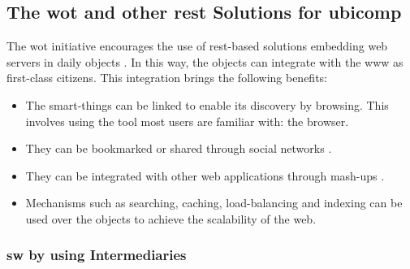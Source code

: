 \subsection{The \acl{wot} and other \ac{rest} Solutions for \acs{ubicomp}}



The \acl{wot} initiative encourages the use of \acs{rest}-based solutions embedding web servers in daily objects \citep{guinard_internet_2011}.
In this way, the objects can integrate with the \ac{www} as first-class citizens. %
This integration brings the following benefits:
\begin{itemize}
  \item The smart-things can be linked to enable its discovery by browsing. This involves using the tool most users are familiar with: the browser.
  \item They can be bookmarked or shared through social networks \citep{guinard_sharing_2010}.
  \item They can be integrated with other web applications through mash-ups \citep{guinard_towards_2009,ostermaier_webplug:_2010,pintus_anatomy_2011}.
  \item Mechanisms such as searching, caching, load-balancing and indexing can be used over the objects to achieve the scalability of the web. %
\end{itemize}




\subsubsection{\acs{sw} by using Intermediaries}
\label{sec:sw_intermediaries}




